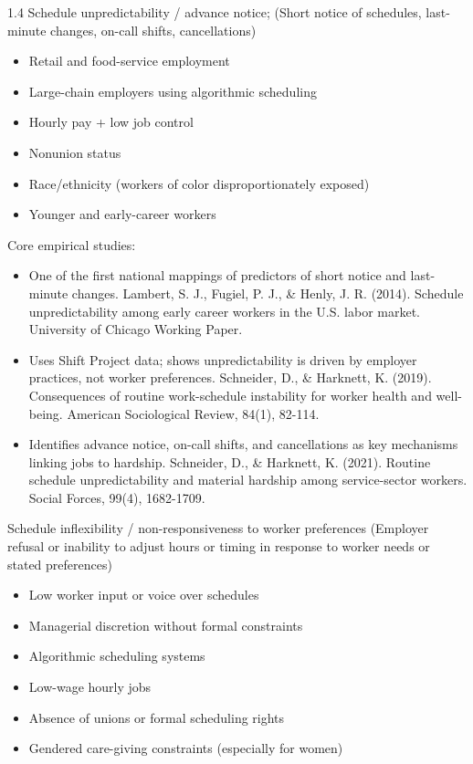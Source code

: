 \documentclass[10pt, letterpaper]{article}
\begin{document}
\begin{spacing}{1.4}
Schedule unpredictability / advance notice; (Short notice of schedules, last-minute changes, on-call shifts, cancellations)
\begin{itemize}
\item Retail and food-service employment                          
\item Large-chain employers using algorithmic scheduling          
\item Hourly pay + low job control                                
\item Nonunion status                                             
\item Race/ethnicity (workers of color disproportionately exposed)
\item Younger and early-career workers                            
\end{itemize}


Core empirical studies:
\begin{itemize}
\item One of the first national mappings of predictors of short notice and last-minute changes. Lambert, S. J., Fugiel, P. J., \& Henly, J. R. (2014). Schedule unpredictability among early career workers in the U.S. labor market. University of Chicago Working Paper.
\item Uses Shift Project data; shows unpredictability is driven by employer practices, not worker preferences. Schneider, D., \& Harknett, K. (2019). Consequences of routine work-schedule instability for worker health and well-being. American Sociological Review, 84(1), 82-114.
\item Identifies advance notice, on-call shifts, and cancellations as key mechanisms linking jobs to hardship. Schneider, D., \& Harknett, K. (2021). Routine schedule unpredictability and material hardship among service-sector workers. Social Forces, 99(4), 1682-1709.
\end{itemize}


Schedule inflexibility / non-responsiveness to worker preferences
(Employer refusal or inability to adjust hours or timing in response to worker needs or stated preferences)
\begin{itemize}
\item Low worker input or voice over schedules              
\item Managerial discretion without formal constraints      
\item Algorithmic scheduling systems                        
\item Low-wage hourly jobs                                  
\item Absence of unions or formal scheduling rights         
\item Gendered care-giving constraints (especially for women)
\end{itemize}


\end{spacing}
\end{document}
